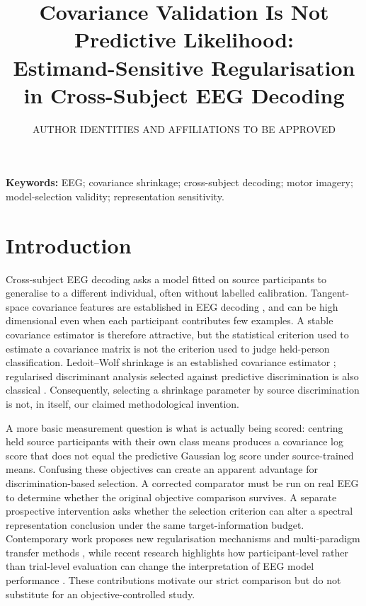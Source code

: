 \documentclass[11pt,a4paper]{article}
\title{Covariance Validation Is Not Predictive Likelihood:\\
Estimand-Sensitive Regularisation in Cross-Subject EEG Decoding}
\author{AUTHOR IDENTITIES AND AFFILIATIONS TO BE APPROVED}
\date{}
\begin{document}
\maketitle

\noindent\textbf{Keywords:} EEG; covariance shrinkage; cross-subject decoding;
motor imagery; model-selection validity; representation sensitivity.

\section{Introduction}
Cross-subject EEG decoding asks a model fitted on source participants to
generalise to a different individual, often without labelled calibration.
Tangent-space covariance features are established in EEG decoding
\cite{barachant2012riemannian}, and can be high dimensional even
when each participant contributes few examples. A stable covariance estimator is therefore
attractive, but the statistical criterion used to estimate a covariance
matrix is not the criterion used to judge held-person classification.
Ledoit--Wolf shrinkage is an established covariance estimator
\cite{ledoit2004}; regularised discriminant analysis selected against
predictive discrimination is also classical \cite{friedman1989}.
Consequently, selecting a shrinkage parameter by source discrimination
is not, in itself, our claimed methodological invention.

A more basic measurement question is what is actually being scored:
centring held source participants with their own class means produces a
covariance log score that does not equal the predictive Gaussian log score
under source-trained means. Confusing these objectives can create an
apparent advantage for discrimination-based selection. A corrected
comparator must be run on real EEG to determine whether the original
objective comparison survives. A separate prospective intervention asks
whether the selection criterion can alter a spectral representation
conclusion under the same target-information budget. Contemporary work proposes
new regularisation mechanisms and multi-paradigm transfer methods
\cite{miao2025freezing,morvay2026wbt,he2026cyclic}, while recent research highlights
how participant-level rather than trial-level evaluation can change the
interpretation of EEG model performance \cite{gil2026subjectvalidation}.
These contributions motivate our strict comparison but do not substitute
for an objective-controlled study.
\end{document}
